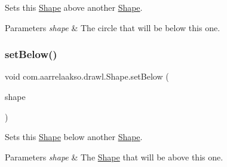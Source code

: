 Sets this \hyperlink{classcom_1_1aarrelaakso_1_1drawl_1_1_shape}{Shape} above another \hyperlink{classcom_1_1aarrelaakso_1_1drawl_1_1_shape}{Shape}. 


\begin{DoxyParams}{Parameters}
{\em shape} & The circle that will be below this one. \\
\hline
\end{DoxyParams}
\mbox{\label{classcom_1_1aarrelaakso_1_1drawl_1_1_shape_a4147526667449f5beb534d4404ba8f77}} 
\subsubsection{\texorpdfstring{set\+Below()}{setBelow()}\hspace{0.1cm}{\footnotesize\ttfamily [1/2]}}
{\footnotesize\ttfamily void com.\+aarrelaakso.\+drawl.\+Shape.\+set\+Below (\begin{DoxyParamCaption}\item[{@Not\+Null final \hyperlink{classcom_1_1aarrelaakso_1_1drawl_1_1_shape}{Shape}}]{shape }\end{DoxyParamCaption})\hspace{0.3cm}{\ttfamily [inherited]}}



Sets this \hyperlink{classcom_1_1aarrelaakso_1_1drawl_1_1_shape}{Shape} below another \hyperlink{classcom_1_1aarrelaakso_1_1drawl_1_1_shape}{Shape}. 


\begin{DoxyParams}{Parameters}
{\em shape} & The \hyperlink{classcom_1_1aarrelaakso_1_1drawl_1_1_shape}{Shape} that will be above this one. \\
\hline
\end{DoxyParams}
\mbox{\label{classcom_1_1aarrelaakso_1_1drawl_1_1_shape_a63c902c4e79235901744c6d83544fa54}} 
